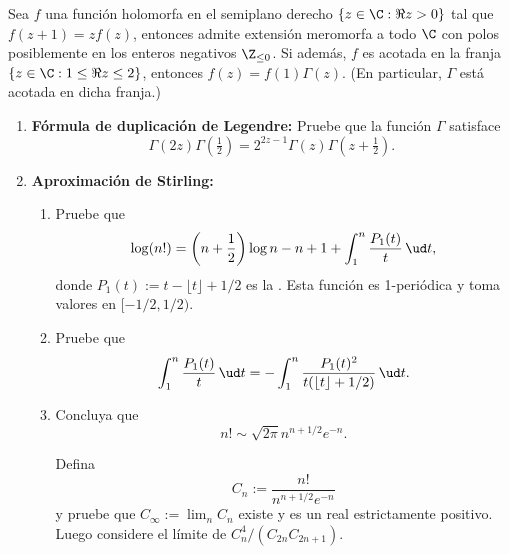 \documentclass[11pt, reqno]{amsart}
\begin{document}
\begin{thm}[Wielandt]
	Sea $f$ una función holomorfa en el semiplano derecho $\{ z \in \C : \Re z > 0 \}$ tal que $f(z + 1) = zf(z)$, entonces admite
	extensión meromorfa a todo $\C$ con polos posiblemente en los enteros negativos $\Z_{\le 0}$.
	Si además, $f$ es acotada en la franja $\{ z \in \C : 1 \le \Re z \le 2 \}$, entonces $f(z) = f(1) \Gamma(z)$.
	(En particular, $\Gamma$ está acotada en dicha franja.)
\end{thm}
\begin{enumerate}[resume]
	\item \textbf{Fórmula de duplicación de Legendre:}
		Pruebe que la función $\Gamma$ satisface
		\[
			\Gamma(2z) \Gamma\left( \tfrac{1}{2} \right) = 2^{2z - 1} \Gamma(z) \Gamma\left( z + \tfrac{1}{2} \right).
		\]

		\newex
	\item\lookst
		\textbf{Aproximación de Stirling:}
		\begin{enumerate}
			\item Pruebe que
				\[
					\log(n!) = \left( n + \frac{1}{2} \right)\log n - n + 1 + \int_{1}^{n} \frac{P_1(t)}{t} \, \ud t,
				\]
				donde $P_1(t) := t - \lfloor t \rfloor + 1/2$ es la .
				Esta función es 1-periódica y toma valores en $[-1/2, 1/2)$.

			\item Pruebe que
				\[
					\int_{1}^{n} \frac{P_1(t)}{t} \, \ud t = -\int_{1}^{n} \frac{P_1(t)^2}{t( \lfloor t \rfloor + 1/2 )}
					\, \ud t.
				\]

			\item Concluya que
				\[
					n! \sim \sqrt{2\pi} n^{n + 1/2} e^{-n}.
				\]
				\begin{hint}
					Defina
					\[
						C_n := \frac{n!}{n^{n + 1/2}e^{-n}}
					\]
					y pruebe que $C_\infty := \lim_n C_n$ existe y es un real estrictamente positivo.
					Luego considere el límite de $C_n^4/(C_{2n} C_{2n+1})$.
				\end{hint}
		\end{enumerate}
\end{enumerate}

\newex
\end{document}
